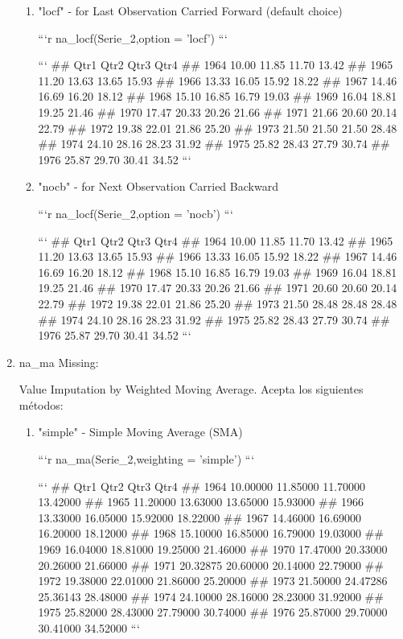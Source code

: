\documentclass[
]{article}
\begin{document}
\begin{enumerate}
\begin{enumerate}
\item "locf" - for Last Observation Carried Forward (default choice)

```r
na_locf(Serie_2,option = 'locf')
```

```
##       Qtr1  Qtr2  Qtr3  Qtr4
## 1964 10.00 11.85 11.70 13.42
## 1965 11.20 13.63 13.65 15.93
## 1966 13.33 16.05 15.92 18.22
## 1967 14.46 16.69 16.20 18.12
## 1968 15.10 16.85 16.79 19.03
## 1969 16.04 18.81 19.25 21.46
## 1970 17.47 20.33 20.26 21.66
## 1971 21.66 20.60 20.14 22.79
## 1972 19.38 22.01 21.86 25.20
## 1973 21.50 21.50 21.50 28.48
## 1974 24.10 28.16 28.23 31.92
## 1975 25.82 28.43 27.79 30.74
## 1976 25.87 29.70 30.41 34.52
```

\item "nocb" - for Next Observation Carried Backward

```r
na_locf(Serie_2,option = 'nocb')
```

```
##       Qtr1  Qtr2  Qtr3  Qtr4
## 1964 10.00 11.85 11.70 13.42
## 1965 11.20 13.63 13.65 15.93
## 1966 13.33 16.05 15.92 18.22
## 1967 14.46 16.69 16.20 18.12
## 1968 15.10 16.85 16.79 19.03
## 1969 16.04 18.81 19.25 21.46
## 1970 17.47 20.33 20.26 21.66
## 1971 20.60 20.60 20.14 22.79
## 1972 19.38 22.01 21.86 25.20
## 1973 21.50 28.48 28.48 28.48
## 1974 24.10 28.16 28.23 31.92
## 1975 25.82 28.43 27.79 30.74
## 1976 25.87 29.70 30.41 34.52
```

\end{enumerate}

\item

na\_ma Missing:

Value Imputation by Weighted Moving Average. Acepta los siguientes
métodos:

\begin{enumerate}
\item "simple" - Simple Moving Average (SMA)

```r
na_ma(Serie_2,weighting = 'simple')
```

```
##          Qtr1     Qtr2     Qtr3     Qtr4
## 1964 10.00000 11.85000 11.70000 13.42000
## 1965 11.20000 13.63000 13.65000 15.93000
## 1966 13.33000 16.05000 15.92000 18.22000
## 1967 14.46000 16.69000 16.20000 18.12000
## 1968 15.10000 16.85000 16.79000 19.03000
## 1969 16.04000 18.81000 19.25000 21.46000
## 1970 17.47000 20.33000 20.26000 21.66000
## 1971 20.32875 20.60000 20.14000 22.79000
## 1972 19.38000 22.01000 21.86000 25.20000
## 1973 21.50000 24.47286 25.36143 28.48000
## 1974 24.10000 28.16000 28.23000 31.92000
## 1975 25.82000 28.43000 27.79000 30.74000
## 1976 25.87000 29.70000 30.41000 34.52000
```


\end{enumerate}
\end{enumerate}
\end{document}
